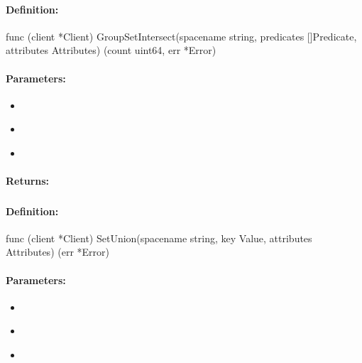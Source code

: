 \paragraph{Definition:}
\begin{gocode}
func (client *Client) GroupSetIntersect(spacename string, predicates []Predicate, attributes Attributes) (count uint64, err *Error)
\end{gocode}

\paragraph{Parameters:}
\begin{itemize}[noitemsep]
\item {}\\

\item {}\\

\item {}\\

\end{itemize}

\paragraph{Returns:}


\pagebreak
\subsubsection{}
\label{api:Go:SetUnion}


\paragraph{Definition:}
\begin{gocode}
func (client *Client) SetUnion(spacename string, key Value, attributes Attributes) (err *Error)
\end{gocode}

\paragraph{Parameters:}
\begin{itemize}[noitemsep]
\item {}\\

\item {}\\

\item {}\\

\end{itemize}

